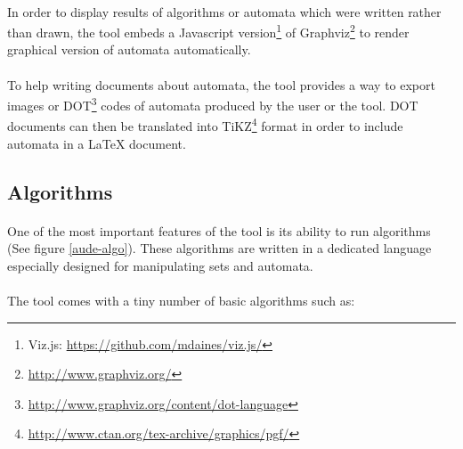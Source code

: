 \documentclass{article}
\begin{document}
\begin{sloppypar}
      
\paragraph{}
In order to display results of algorithms or automata which were written rather than drawn, the tool embeds a Javascript version\footnote{Viz.js: \href{https://github.com/mdaines/viz.js/}{https://github.com/mdaines/viz.js/}} of Graphviz\footnote{\href{http://www.graphviz.org/}{http://www.graphviz.org/}} to render graphical version of automata automatically.

      
\paragraph{}
To help writing documents about automata, the tool provides a way to export images or DOT\footnote{\href{http://www.graphviz.org/content/dot-language}{http://www.graphviz.org/content/dot-language}} codes of automata produced by the user or the tool. DOT documents can then be translated into TiKZ\footnote{\href{http://www.ctan.org/tex-archive/graphics/pgf/}{http://www.ctan.org/tex-archive/graphics/pgf/}} format in order to include automata in a LaTeX document.
   
   
   

\subsection{ Algorithms}


\paragraph{}
One of the most important features of the tool is its ability to run algorithms (See figure \ref{aude-algo}). These algorithms are written in a dedicated language especially designed for manipulating sets and automata. 

      
\paragraph{}
The tool comes with a tiny number of basic algorithms such as:
       

\end{sloppypar}
\end{document}
